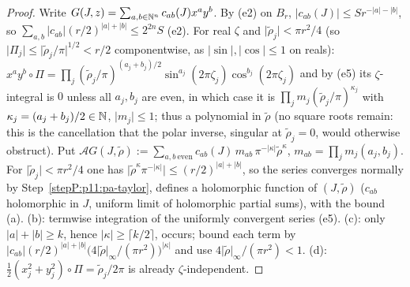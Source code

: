 \begin{proof}
\label{stepP:p11:pa-taylor} Write $G(J,z)=\sum_{a,b\in\mathbb{N}^n}c_{ab}(J)x^ay^b$. By (e2) on $B_r$, $\lvert c_{ab}(J)\rvert\le Sr^{-\lvert a\rvert-\lvert b\rvert}$, so $\sum_{a,b}\lvert c_{ab}\rvert(r/2)^{\lvert a\rvert+\lvert b\rvert}\le2^{2n}S$ (e2).
\label{stepP:p11:pa-mono} For real $\zeta$ and $\lvert\tilde\rho_j\rvert<\pi r^2/4$ (so $\lvert\Pi_j\rvert\le\lvert\tilde\rho_j/\pi\rvert^{1/2}<r/2$ componentwise, as $\lvert\sin\rvert,\lvert\cos\rvert\le1$ on reals): $x^ay^b\circ\Pi=\prod_j(\tilde\rho_j/\pi)^{(a_j+b_j)/2}\sin^{a_j}(2\pi\zeta_j)\cos^{b_j}(2\pi\zeta_j)$ and by (e5) its $\zeta$-integral is $0$ unless all $a_j,b_j$ are even, in which case it is $\prod_jm_j(\tilde\rho_j/\pi)^{\kappa_j}$ with $\kappa_j=(a_j+b_j)/2\in\mathbb{N}$, $\lvert m_j\rvert\le1$; thus a polynomial in $\tilde\rho$ (no square roots remain: this is the cancellation that the polar inverse, singular at $\tilde\rho_j=0$, would otherwise obstruct).
\label{stepP:p11:pa-series} Put $\mathcal AG(J,\tilde\rho):=\sum_{a,b\ \mathrm{even}}c_{ab}(J)\,m_{ab}\,\pi^{-\lvert\kappa\rvert}\tilde\rho^{\kappa}$, $m_{ab}=\prod_jm_j(a_j,b_j)$. For $\lvert\tilde\rho_j\rvert<\pi r^2/4$ one has $\lvert\tilde\rho^\kappa\pi^{-\lvert\kappa\rvert}\rvert\le(r/2)^{\lvert a\rvert+\lvert b\rvert}$, so the series converges normally by Step~\ref{stepP:p11:pa-taylor}, defines a holomorphic function of $(J,\tilde\rho)$ ($c_{ab}$ holomorphic in $J$, uniform limit of holomorphic partial sums), with the bound (a). (b): termwise integration of the uniformly convergent series (e5). (c): only $\lvert a\rvert+\lvert b\rvert\ge k$, hence $\lvert\kappa\rvert\ge\lceil k/2\rceil$, occurs; bound each term by $\lvert c_{ab}\rvert(r/2)^{\lvert a\rvert+\lvert b\rvert}\bigl(4\lvert\tilde\rho\rvert_\infty/(\pi r^2)\bigr)^{\lvert\kappa\rvert}$ and use $4\lvert\tilde\rho\rvert_\infty/(\pi r^2)<1$. (d): $\frac12(x_j^2+y_j^2)\circ\Pi=\tilde\rho_j/2\pi$ is already $\zeta$-independent.
\end{proof}

